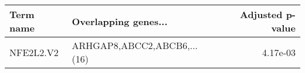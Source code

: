 \begin{tabular}{llr}
\toprule
Term name &        Overlapping genes... &  Adjusted p-value \\
\midrule
NFE2L2.V2 & ARHGAP8,ABCC2,ABCB6,...(16) &          4.17e-03 \\
\bottomrule
\end{tabular}
